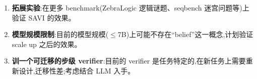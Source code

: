\documentclass[fontset=none,10.5pt]{ctexart}
\begin{document}
\begin{enumerate}
  \begin{itemize}
  \item \textbf{符合前提}:认证题的失败发生在远离上下文上限的位置(叙事+链远小于 8192 token 上限,而 80\% 可判定题仍含全票错步)。出错不是``存不下'',是``用不好'',与``推理步数远小于容量时错误已高发''的观察一致;
  \item \textbf{状态化去噪}:走识别通道(枚举 + 似然),比较(规范化重置)与(不重置)两个对照的结果差异。
  \end{itemize}
\item \textbf{拓展实验}:在更多 benchmark(ZebraLogic 逻辑谜题、seqbench 迷宫问题等)上验证 SAVI 的效果。
\item \textbf{模型规模限制}:目前的模型规模($\le$7B)上可能不存在``belief''这一概念,计划验证 scale up 之后的效果。
\item \textbf{训一个可迁移的步级 verifier}:目前的 verifier 是任务特定的,在新任务上需要重新设计,迁移性差;考虑结合 LLM 入手。
\end{enumerate}
\end{document}
